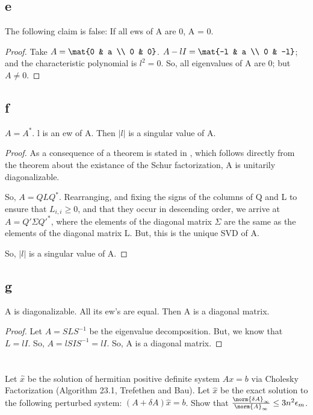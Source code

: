 \documentclass[10pt]{amsart}
\begin{document}
\subsection{e}
\begin{thm}
The following claim is false:
If all ews of A are 0, A = 0.
\end{thm}
\begin{proof}
Take $A = \mat{0 & a \\ 0 & 0}$. $A-lI = \mat{-l & a \\ 0 & -l}$; and the characteristic polynomial is $l^{2} = 0$. So, all eigenvalues of A are 0; but $A \neq 0$.
\end{proof}

\subsection{f}
\begin{thm}
$A=A^{*}$. l is an ew of A. Then $|l|$ is a singular value of A.
\end{thm}
\begin{proof}
As a consequence of a theorem is stated in \cite{trefBau}, which follows directly from the theorem about the existance of the Schur factorization, A is unitarily diagonalizable.

So, $A=QLQ^{*}$. Rearranging, and fixing the signs of the columns of Q and L to ensure that $L_{i,i} \geq 0$, and that they occur in descending order, we arrive at $A=Q'\Sigma Q'^{*}$, where the elements of the diagonal matrix $\Sigma$ are the same as the elements of the diagonal matrix L. But, this is the unique SVD of A.

So, $|l|$ is a singular value of A.
\end{proof}

\subsection{g}
\begin{thm}
A is diagonalizable. All its ew's are equal. Then A is a diagonal matrix.
\end{thm}
\begin{proof}
Let $A = SLS^{-1}$ be the eigenvalue decomposition. But, we know that $L = lI$. So, $A = lSIS^{-1} = lI$. So, A is a diagonal matrix.
\end{proof}

\section{}
\begin{thm}
Let $\hat{x}$ be the solution of hermitian positive definite system $Ax=b$ via Cholesky Factorization (Algorithm 23.1, Trefethen and Bau). Let $\hat{x}$ be the exact solution to the following perturbed system: $(A+\delta A)\hat{x}=b$. Show that $\frac{\norm{\delta A}_\infty}{\norm{A}_\infty}\leq 3n^2\epsilon_{m}$.
\end{thm}
\end{document}
